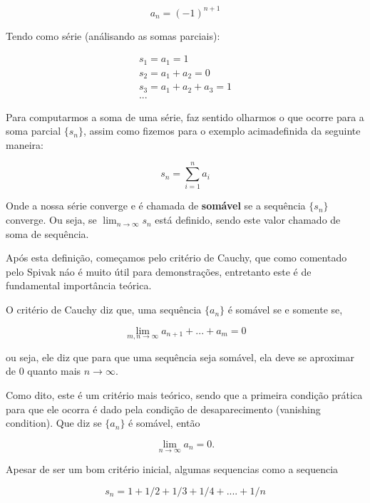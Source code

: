\documentclass[a4paper, 12pt]{article}
\begin{document}
\begin{equation}
	\nonumber a_n = (-1)^{n+1}
\end{equation}

Tendo como série (análisando as somas parciais):

\begin{align*}
	s_1 = a_1 = 1\\
	s_2 = a_1 + a_2 = 0\\
	s_3 = a_1 + a_2 + a_3 = 1\\
	...
\end{align*}

Para computarmos a soma de uma série, faz sentido olharmos o que ocorre para a soma parcial
$\{s_n\}$, assim como fizemos para o exemplo acimadefinida da seguinte maneira:

\begin{equation}
	\nonumber s_n = \sum_{i=1}^{n} a_i
\end{equation}

Onde a nossa série converge e é chamada de \textbf{somável} se a sequência $\{s_n\}$ converge.
Ou seja, se $\lim_{n \to \infty} s_n $ está definido, sendo este valor chamado de soma de sequência.

Após esta definição, começamos pelo critério de Cauchy, que como comentado pelo Spivak
náo é muito útil para demonstrações, entretanto este é de fundamental importância teórica.

O critério de Cauchy diz que, uma sequência $\{a_n\}$ é somável se e somente se,

\begin{equation}
	\nonumber \lim_{m,n \to \infty} a_{n+1} + ... + a_m = 0
\end{equation}

ou seja, ele diz que para que uma sequência seja somável, ela deve se aproximar de $0$
quanto mais $ n\to \infty$.

Como dito, este é um critério mais teórico, sendo que a primeira condição prática para 
que ele ocorra é dado pela condição de desaparecimento (vanishing condition). Que diz
se $\{a_n\}$ é somável, então 


\begin{equation}
	\nonumber \lim_{n \to \infty } a_n = 0.
\end{equation}

Apesar de ser um bom critério inicial, algumas sequencias como a sequencia

\begin{equation}
	\nonumber s_n = 1 + 1/2 + 1/3 + 1/4 + .... + 1/n
\end{equation}
\end{document}
